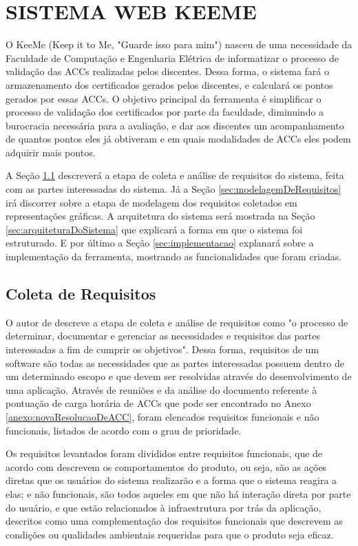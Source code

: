 \chapter{SISTEMA WEB KEEME} 
\label{chap:proposta}

O KeeMe (Keep it to Me, "Guarde isso para mim") nasceu de uma necessidade da Faculdade de Computação e Engenharia Elétrica de informatizar o processo de validação das ACCs realizadas pelos discentes. Dessa forma, o sistema fará o armazenamento dos certificados gerados pelos discentes, e calculará os pontos gerados por essas ACCs. O objetivo principal da ferramenta é simplificar o processo de validação dos certificados por parte da faculdade, diminuindo a burocracia necessária para a avaliação, e dar aos discentes um acompanhamento de quantos pontos eles já obtiveram e em quais modalidades de ACCs eles podem adquirir mais pontos.

A Seção \ref{sec:coleta_de_requisitos} descreverá a etapa de coleta e análise de requisitos do sistema, feita com as partes interessadas do sistema. Já a Seção \ref{sec:modelagemDeRequisitos} irá discorrer sobre a etapa de modelagem dos requisitos coletados em representações gráficas. A arquitetura do sistema será mostrada na Seção \ref{sec:arquiteturaDoSistema} que explicará a forma em que o sistema foi estruturado. E por último a Seção \ref{sec:implementacao} explanará sobre a implementação da ferramenta, mostrando as funcionalidades que foram criadas.

\section{Coleta de Requisitos}
\label{sec:coleta_de_requisitos}

O autor de \cite{pmbok2017} descreve a etapa de coleta e análise de requisitos como "o processo de determinar, documentar e gerenciar as necessidades e requisitos das partes interessadas a fim de cumprir os objetivos". Dessa forma, requisitos de um software são todas as necessidades que as partes interessadas possuem dentro de um determinado escopo e que devem ser resolvidas através do desenvolvimento de uma aplicação. Através de reuniões e da análise do documento referente à pontuação de carga horária de ACCs que pode ser encontrado no Anexo \ref{anexo:novaResolucaoDeACC}, foram elencados requisitos funcionais e não funcionais, listados de acordo com o grau de prioridade.

Os requisitos levantados foram divididos entre requisitos funcionais, que de acordo com \cite{pmbok2017} descrevem os comportamentos do produto, ou seja, são as ações diretas que os usuários do sistema realizarão e a forma que o sistema reagira a elas; e não funcionais, são todos aqueles em que não há interação direta por parte do usuário, e que estão relacionados à infraestrutura por trás da aplicação, descritos como uma complementação dos requisitos funcionais que descrevem as condições ou qualidades ambientais requeridas para que o produto seja eficaz.

